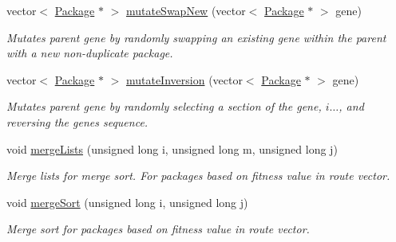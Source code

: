 \begin{DoxyCompactItemize}
vector$<$ \hyperlink{classPackage}{Package} $\ast$ $>$ \hyperlink{classGenetic_a06ee249915955e615f14840801e31868}{mutate\+Swap\+New} (vector$<$ \hyperlink{classPackage}{Package} $\ast$ $>$ gene)
\begin{DoxyCompactList}\small\item\em Mutates parent gene by randomly swapping an existing gene within the parent with a new non-\/duplicate package. \end{DoxyCompactList}\item 
vector$<$ \hyperlink{classPackage}{Package} $\ast$ $>$ \hyperlink{classGenetic_ac5c09107f09874e7de477332be61512f}{mutate\+Inversion} (vector$<$ \hyperlink{classPackage}{Package} $\ast$ $>$ gene)
\begin{DoxyCompactList}\small\item\em Mutates parent gene by randomly selecting a section of the gene, $i\dots$, and reversing the genes sequence. \end{DoxyCompactList}\item 
void \hyperlink{classGenetic_a31d803b490507d3fa5cead22fd1cfbf6}{merge\+Lists} (unsigned long i, unsigned long m, unsigned long j)\hypertarget{classGenetic_a31d803b490507d3fa5cead22fd1cfbf6}{}\label{classGenetic_a31d803b490507d3fa5cead22fd1cfbf6}

\begin{DoxyCompactList}\small\item\em Merge lists for merge sort. For packages based on fitness value in route vector. \end{DoxyCompactList}\item 
void \hyperlink{classGenetic_aa132e3f98a13ebab58da4449a4419bd7}{merge\+Sort} (unsigned long i, unsigned long j)\hypertarget{classGenetic_aa132e3f98a13ebab58da4449a4419bd7}{}\label{classGenetic_aa132e3f98a13ebab58da4449a4419bd7}

\begin{DoxyCompactList}\small\item\em Merge sort for packages based on fitness value in route vector. \end{DoxyCompactList}\end{DoxyCompactItemize}
